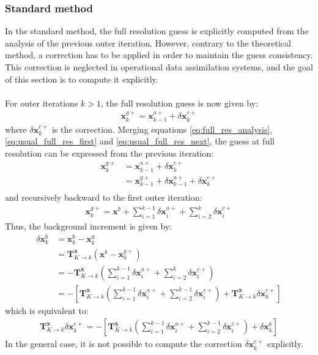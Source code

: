 \documentclass[12pt]{scrartcl}
\begin{document}
\subsubsection{Standard method}
In the standard method, the full resolution guess is explicitly computed from the analysis of the previous outer iteration. However, contrary to the theoretical method, a correction has to be applied in order to maintain the guess consistency. This correction is neglected in operational data assimilation systems, and the goal of this section is to compute it explicitly.\\
$  $\\
For outer iterations $k>1$, the full resolution guess is now given by:
\begin{align}
\label{eq:usual_full_res_next}
\mathbf{x}^{g+}_k = \mathbf{x}^{a+}_{k-1} + \delta \mathbf{x}^{c+}_{k}
\end{align}
where $\delta \mathbf{x}^{c+}_{k}$ is the correction. Merging equations \eqref{eq:full_res_analysis}, \eqref{eq:usual_full_res_first} and \eqref{eq:usual_full_res_next}, the guess at full resolution can be expressed from the previous iteration:
\begin{align}
\mathbf{x}^{g+}_k & = \mathbf{x}^{a+}_{k-1}+\delta \mathbf{x}^{c+}_k \nonumber \\
& = \mathbf{x}^{g+}_{k-1} + \delta \mathbf{x}^{a+}_{k-1} + \delta \mathbf{x}^{c+}_k \nonumber \\
\end{align}
and recursively backward to the first outer iteration:
\begin{align}
\label{eq:usual_full_res}
\mathbf{x}^{g+}_k = \mathbf{x}^{b} + \sum_{i=1}^{k-1} \delta \mathbf{x}^{a+}_i + \sum_{i=2}^k \delta \mathbf{x}^{c+}_i
\end{align}
Thus, the background increment is given by:
\begin{align}
\delta \mathbf{x}^b_k & = \mathbf{x}^b_k - \mathbf{x}^g_k \nonumber \\
& = \mathbf{T}^\mathbf{x}_{K \rightarrow k} \left(\mathbf{x}^b - \mathbf{x}^{g+}_k\right) \nonumber \\
& = - \mathbf{T}^\mathbf{x}_{K \rightarrow k} \left(\sum_{i=1}^{k-1} \delta \mathbf{x}^{a+}_i + \sum_{i=2}^k \delta \mathbf{x}^{c+}_i\right) \nonumber \\
& = - \left[\mathbf{T}^\mathbf{x}_{K \rightarrow k} \left(\sum_{i=1}^{k-1} \delta \mathbf{x}^{a+}_i + \sum_{i=2}^{k-1} \delta \mathbf{x}^{c+}_i\right) + \mathbf{T}^\mathbf{x}_{K \rightarrow k} \delta \mathbf{x}^{c+}_k\right]
\end{align}
which is equivalent to:
\begin{align}
\mathbf{T}^\mathbf{x}_{K \rightarrow k} \delta \mathbf{x}^{c+}_k = - \left[\mathbf{T}^\mathbf{x}_{K \rightarrow k} \left(\sum_{i=1}^{k-1} \delta \mathbf{x}^{a+}_i + \sum_{i=2}^{k-1} \delta \mathbf{x}^{c+}_i\right) + \delta \mathbf{x}^b_k\right]
\end{align}
In the general case, it is not possible to compute the correction $\delta \mathbf{x}^{c+}_k$ explicitly.
\end{document}
